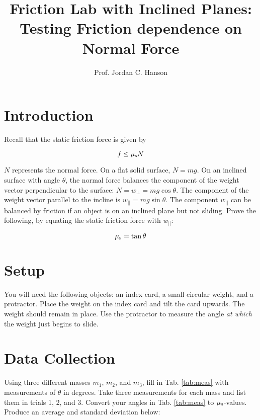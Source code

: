\documentclass{article}
\begin{document}
\title{Friction Lab with Inclined Planes: Testing Friction dependence on Normal Force}
\author{Prof. Jordan C. Hanson}

\maketitle

\section{Introduction}

Recall that the static friction force is given by

\begin{equation}
f \leq \mu_{\rm s} N
\end{equation}

$N$ represents the normal force.  On a flat solid surface, $N = mg$.  On an inclined surface with angle $\theta$, the normal force balances the component of the weight vector perpendicular to the surface: $N = w_{\perp} = mg \cos\theta$.  The component of the weight vector parallel to the incline is $w_{||} = mg \sin\theta$.  The component $w_{||}$ can be balanced by friction if an object is on an inclined plane but not sliding.  Prove the following, by equating the static friction force with $w_{||}$:

\begin{equation}
\mu_{\rm s} = \tan\theta
\end{equation}

\section{Setup}

You will need the following objects: an index card, a small circular weight, and a protractor.  Place the weight on the index card and tilt the card upwards. The weight should remain in place.  Use the protractor to measure the angle \textit{at which} the weight just begins to slide.

\section{Data Collection}

Using three different masses $m_1$, $m_2$, and $m_3$, fill in Tab. \ref{tab:meas} with measurements of $\theta$ in degrees.  Take three measurements for each mass and list them in trials 1, 2, and 3.  Convert your angles in Tab. \ref{tab:meas} to $\mu_{\rm s}$-values.  Produce an average and standard deviation below: \\ \\
\end{document}
